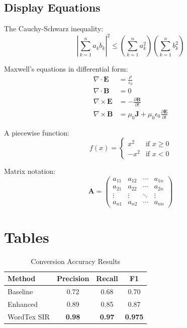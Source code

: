 \documentclass[conference]{IEEEtran}
\begin{document}
\subsection{Display Equations}

The Cauchy-Schwarz inequality:
\begin{equation}
    \label{eq:cauchy-schwarz}
    \left| \sum_{k=1}^{n} a_k b_k \right|^2 \leq
    \left( \sum_{k=1}^{n} a_k^2 \right)
    \left( \sum_{k=1}^{n} b_k^2 \right)
\end{equation}

Maxwell's equations in differential form:
\begin{align}
    \nabla \cdot \mathbf{E} &= \frac{\rho}{\epsilon_0} \label{eq:gauss} \\
    \nabla \cdot \mathbf{B} &= 0 \label{eq:gauss-mag} \\
    \nabla \times \mathbf{E} &= -\frac{\partial \mathbf{B}}{\partial t} \label{eq:faraday} \\
    \nabla \times \mathbf{B} &= \mu_0 \mathbf{J} + \mu_0 \epsilon_0 \frac{\partial \mathbf{E}}{\partial t} \label{eq:ampere}
\end{align}

A piecewise function:
\begin{equation}
    f(x) = \begin{cases}
        x^2 & \text{if } x \geq 0 \\
        -x^2 & \text{if } x < 0
    \end{cases}
\end{equation}

Matrix notation:
\begin{equation}
    \mathbf{A} = \begin{pmatrix}
        a_{11} & a_{12} & \cdots & a_{1n} \\
        a_{21} & a_{22} & \cdots & a_{2n} \\
        \vdots & \vdots & \ddots & \vdots \\
        a_{n1} & a_{n2} & \cdots & a_{nn}
    \end{pmatrix}
\end{equation}

\section{Tables}
\label{sec:tables}

\begin{table}[htbp]
    \caption{Conversion Accuracy Results}
    \label{tab:results}
    \centering
    \begin{tabular}{@{}lccc@{}}
        \toprule
        \textbf{Method} & \textbf{Precision} & \textbf{Recall} & \textbf{F1} \\
        \midrule
        Baseline     & 0.72 & 0.68 & 0.70 \\
        Enhanced     & 0.89 & 0.85 & 0.87 \\
        WordTex SIR  & \textbf{0.98} & \textbf{0.97} & \textbf{0.975} \\
        \bottomrule
    \end{tabular}
\end{table}
\end{document}

